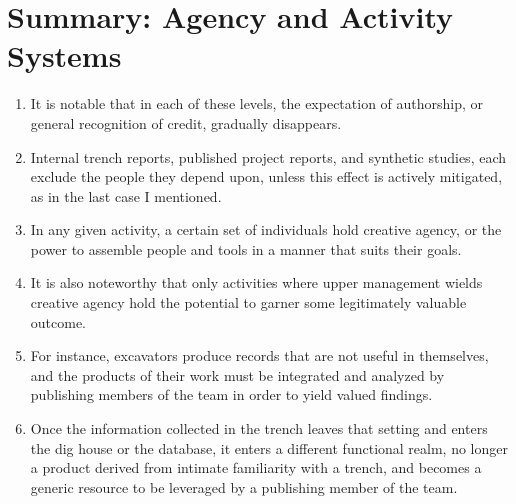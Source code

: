\documentclass{article}
\begin{document}
\section{Summary: Agency and Activity Systems}
\begin{enumerate}
  \item It is notable that in each of these levels, the expectation of authorship, or general recognition of credit, gradually disappears.
  \item Internal trench reports, published project reports, and synthetic studies, each exclude the people they depend upon, unless this effect is actively mitigated, as in the last case I mentioned.
  \item In any given activity, a certain set of individuals hold creative agency, or the power to assemble people and tools in a manner that suits their goals.
  \item It is also noteworthy that only activities where upper management wields creative agency hold the potential to garner some legitimately valuable outcome.
  \item For instance, excavators produce records that are not useful in themselves, and the products of their work must be integrated and analyzed by publishing members of the team in order to yield valued findings.
  \item Once the information collected in the trench leaves that setting and enters the dig house or the database, it enters a different functional realm, no longer a product derived from intimate familiarity with a trench, and becomes a generic resource to be leveraged by a publishing member of the team.
\end{enumerate}
\end{document}

